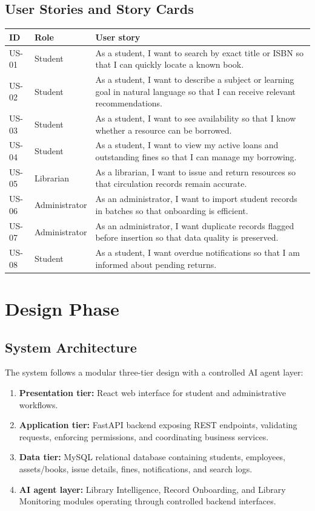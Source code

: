 \documentclass[12pt,a4paper]{report}
\begin{document}
\section{User Stories and Story Cards}
\begin{longtable}{p{1.2cm}p{3cm}p{7.7cm}}
\toprule
\textbf{ID} & \textbf{Role} & \textbf{User story}\\
\midrule
US-01 & Student & As a student, I want to search by exact title or ISBN so that I can quickly locate a known book.\\
US-02 & Student & As a student, I want to describe a subject or learning goal in natural language so that I can receive relevant recommendations.\\
US-03 & Student & As a student, I want to see availability so that I know whether a resource can be borrowed.\\
US-04 & Student & As a student, I want to view my active loans and outstanding fines so that I can manage my borrowing.\\
US-05 & Librarian & As a librarian, I want to issue and return resources so that circulation records remain accurate.\\
US-06 & Administrator & As an administrator, I want to import student records in batches so that onboarding is efficient.\\
US-07 & Administrator & As an administrator, I want duplicate records flagged before insertion so that data quality is preserved.\\
US-08 & Student & As a student, I want overdue notifications so that I am informed about pending returns.\\
\bottomrule
\end{longtable}

\chapter{Design Phase}

\section{System Architecture}
The system follows a modular three-tier design with a controlled AI agent layer:
\begin{enumerate}
\item \textbf{Presentation tier:} React web interface for student and administrative workflows.
\item \textbf{Application tier:} FastAPI backend exposing REST endpoints, validating requests, enforcing permissions, and coordinating business services.
\item \textbf{Data tier:} MySQL relational database containing students, employees, assets/books, issue details, fines, notifications, and search logs.
\item \textbf{AI agent layer:} Library Intelligence, Record Onboarding, and Library Monitoring modules operating through controlled backend interfaces.
\end{enumerate}
\end{document}
